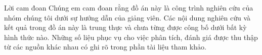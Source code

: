 \begin{preface}{Lời cam đoan}
Chúng em cam đoan rằng đồ án này là công trình nghiên cứu của nhóm chúng tôi dưới sự hướng dẫn của giảng viên. Các nội dung nghiên cứu và kết quả trong đồ án này là trung thực và chưa từng được công bố dưới bất kỳ hình thức nào. Những số liệu phục vụ cho việc phân tích, đánh giá được thu thập từ các nguồn khác nhau có ghi rõ trong phần tài liệu tham khảo.
\end{preface}
